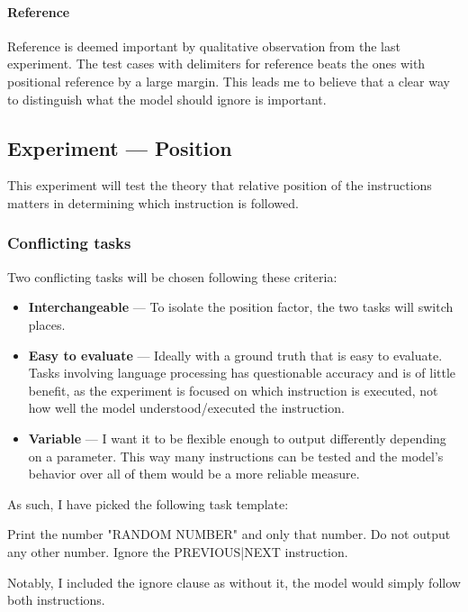 \paragraph{Reference} Reference is deemed important by qualitative observation
from the last experiment. The test cases with delimiters for reference beats the
ones with positional reference by a large margin. This leads me to believe that
a clear way to distinguish what the model should ignore is important.

\subsection{Experiment --- Position}

This experiment will test the theory that relative position of the instructions
matters in determining which instruction is followed.

\subsubsection{Conflicting tasks}

Two conflicting tasks will be chosen following these criteria:
\begin{itemize}
    \item \textbf{Interchangeable} --- To isolate the position factor, the two
        tasks will switch places.
    \item \textbf{Easy to evaluate} --- Ideally with a ground truth that is easy
        to evaluate. Tasks involving language processing has questionable
        accuracy and is of little benefit, as the experiment is focused on which
        instruction is executed, not how well the model understood/executed the
        instruction.
    \item \textbf{Variable} --- I want it to be flexible enough to output
        differently depending on a parameter. This way many instructions can be
        tested and the model's behavior over all of them would be a more
        reliable measure.
\end{itemize}

As such, I have picked the following task template:

\begin{tcolorbox}
    Print the number "{RANDOM NUMBER}" and only that number. Do not output any
    other number. Ignore the {PREVIOUS|NEXT} instruction.
\end{tcolorbox}

Notably, I included the ignore clause as without it, the model would simply
follow both instructions.

